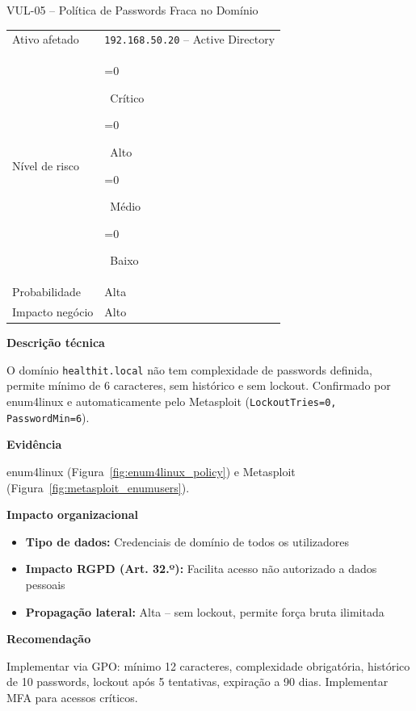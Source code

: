 \documentclass[12pt, a4paper]{report}
\newcommand{\risk}[1]{%
  \ifnum\pdfstrcmp{#1}{Critico}=0{\colorbox{Critical}{\color{white}\bfseries\footnotesize\strut~Crítico~}}\fi
  \ifnum\pdfstrcmp{#1}{Alto}=0{\colorbox{High}{\color{white}\bfseries\footnotesize\strut~Alto~}}\fi
  \ifnum\pdfstrcmp{#1}{Medio}=0{\colorbox{Medium}{\color{black}\bfseries\footnotesize\strut~Médio~}}\fi
  \ifnum\pdfstrcmp{#1}{Baixo}=0{\colorbox{Low}{\color{white}\bfseries\footnotesize\strut~Baixo~}}\fi}
\begin{document}
\vspace{0.8em}

\begin{finding}{VUL-05 -- Política de Passwords Fraca no Domínio}
\begin{tabular}{@{}ll@{}}
  \small\color{TextGray}Ativo afetado   & \texttt{192.168.50.20} -- Active Directory \\[3pt]
  \small\color{TextGray}Nível de risco  & \risk{Alto} \\[3pt]
  \small\color{TextGray}Probabilidade   & Alta \\[3pt]
  \small\color{TextGray}Impacto negócio & Alto \\
\end{tabular}

\vspace{8pt}\textbf{Descrição técnica}

O domínio \texttt{healthit.local} não tem complexidade de passwords definida, permite mínimo
de 6 caracteres, sem histórico e sem lockout. Confirmado por enum4linux e automaticamente
pelo Metasploit (\texttt{LockoutTries=0, PasswordMin=6}).

\vspace{6pt}\textbf{Evidência}

enum4linux (Figura~\ref{fig:enum4linux_policy}) e Metasploit (Figura~\ref{fig:metasploit_enumusers}).

\vspace{4pt}\textbf{Impacto organizacional}
\begin{itemize}[itemsep=1pt]
  \item \textbf{Tipo de dados:} Credenciais de domínio de todos os utilizadores
  \item \textbf{Impacto RGPD (Art. 32.º):} Facilita acesso não autorizado a dados pessoais
  \item \textbf{Propagação lateral:} Alta -- sem lockout, permite força bruta ilimitada
\end{itemize}

\vspace{4pt}\textbf{Recomendação}

Implementar via GPO: mínimo 12 caracteres, complexidade obrigatória, histórico de 10 passwords,
lockout após 5 tentativas, expiração a 90 dias. Implementar MFA para acessos críticos.
\end{finding}

\vspace{0.8em}
\end{document}
